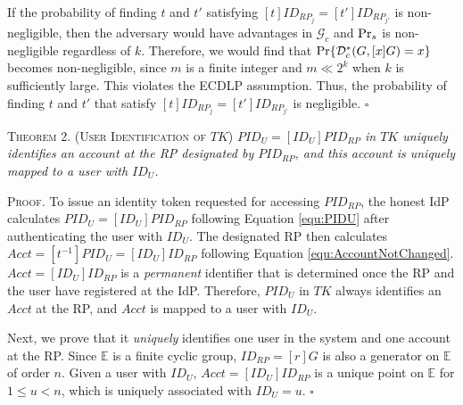 \newc
If the probability of finding $t$ and $t'$ satisfying $[t]ID_{RP_j} = [t']ID_{RP_{j'}}$ is non-negligible,
 then the adversary would have advantages in $\mathcal{G}_c$ and ${\rm Pr}_s$ is non-negligible regardless of $k$.
Therefore, we would find that ${\rm Pr}\{\mathcal{D}^*_c(G, [x]G)=x\}$ becomes non-negligible, since $m$ is a finite integer and $m \ll 2^k$ when $k$ is sufficiently large.
\oldc
This violates the ECDLP assumption. Thus, the probability of finding $t$ and $t'$ that satisfy $[t]ID_{RP_j} = [t']ID_{RP_{j'}}$ is negligible. \hfill $\square$


\newc
\vspace{3mm}
\noindent\textsc{Theorem 2. (User Identification of $TK$)} {\em $PID_U= [ID_U]PID_{RP}$ in $TK$ uniquely identifies an account at the RP designated by $PID_{RP}$, and this account is uniquely mapped to a user with $ID_U$.}


\vspace{0.75mm}
\noindent\textsc{Proof.}
To issue an identity token requested for accessing $PID_{RP}$, the honest IdP calculates $PID_U = [ID_U]PID_{RP}$ following Equation \ref{equ:PIDU} after authenticating the user with $ID_U$. The designated RP then calculates $Acct = [t^{-1}]PID_{U} = [ID_U]ID_{RP}$ following Equation \ref{equ:AccountNotChanged}.
$Acct = [ID_U]ID_{RP}$ is a \emph{permanent} identifier that is determined once the RP and the user have registered at the IdP. Therefore, $PID_U$ in $TK$ always identifies an $Acct$ at the RP, and $Acct$ is mapped to a user with $ID_U$.

Next, we prove that it \emph{uniquely} identifies one user in the system and one account at the RP. Since $\mathbb{E}$ is a finite cyclic group, $ID_{RP} = [r]G$ is also a generator on $\mathbb{E}$ of order $n$. Given a user with $ID_U$, $Acct = [ID_U]ID_{RP}$ is a unique point on $\mathbb{E}$ for $1 \leq u < n$, which is uniquely associated with $ID_U=u$. \hfill $\square$


